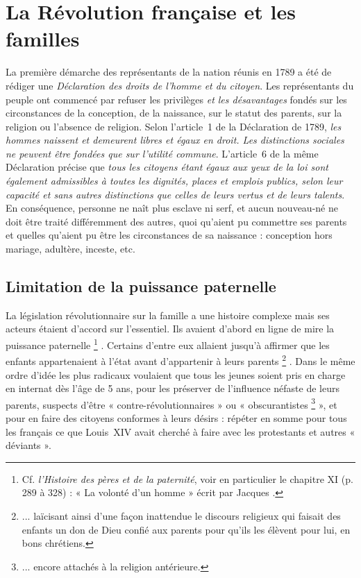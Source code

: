 
\chapter{La Révolution française et les familles}


%
 La première démarche des représentants de la nation réunis en 1789 a été de rédiger une \emph{Déclaration des droits de l'homme et du citoyen}. Les représentants du peuple ont commencé par refuser les privilèges \emph{et les désavantages} fondés sur les circonstances de la conception, de la naissance, sur le statut des parents, sur la religion ou l'absence de religion. Selon l'article~1 de la Déclaration de 1789, \emph{les hommes naissent et demeurent libres et égaux en droit. Les distinctions sociales ne peuvent être fondées que sur l'utilité commune}. L'article~6 de la même Déclaration précise que \emph{tous les citoyens étant égaux aux yeux de la loi sont également admissibles à toutes les dignités, places et emplois publics, selon leur capacité et sans autres distinctions que celles de leurs vertus et de leurs talents}. En conséquence, personne ne naît plus esclave ni serf, et aucun nouveau-né ne doit être traité différemment des autres, quoi qu'aient pu commettre ses parents et quelles qu'aient pu être les circonstances de sa naissance : conception hors mariage, adultère, inceste, etc. 


\section{Limitation de la puissance paternelle}

 La législation révolutionnaire sur la famille a une histoire complexe mais ses acteurs étaient d'accord sur l'essentiel. Ils avaient d'abord en ligne de mire la puissance paternelle%
\footnote{Cf. \emph{l'Histoire des pères et de la paternité}, voir en particulier le chapitre XI (p. 289 à 328) : « La volonté d'un homme » écrit par Jacques .}%
. Certains d'entre eux allaient jusqu'à affirmer que les enfants appartenaient à l'état avant d'appartenir à leurs parents%
\footnote{... laïcisant ainsi d'une façon inattendue le discours religieux qui faisait des enfants un don de Dieu confié aux parents pour qu'ils les élèvent pour lui, en bons chrétiens.}%
. Dans le même ordre d'idée les plus radicaux voulaient que tous les jeunes soient pris en charge en internat dès l'âge de 5 ans, pour les préserver de l'influence néfaste de leurs parents, suspects d'être {« contre-révolutionnaires »} ou « {obscurantistes}%
\footnote{... encore attachés à la religion antérieure.} 
», et pour en faire des citoyens conformes à leurs désirs : répéter en somme pour tous les français ce que Louis~XIV avait cherché à faire avec les protestants et autres « déviants ».


